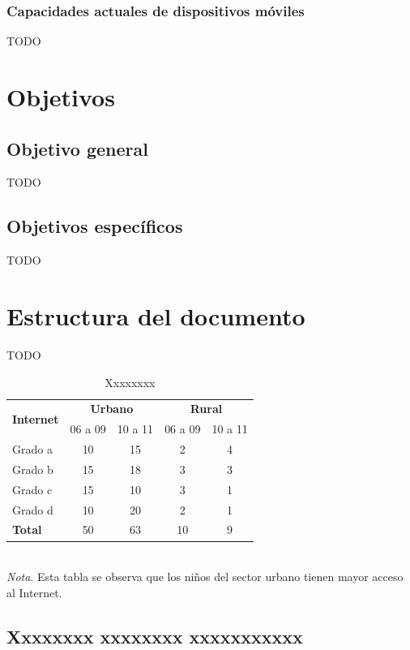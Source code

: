 \subsubsection{Capacidades actuales de dispositivos móviles}
TODO

\section{Objetivos}

\subsection{Objetivo general}
TODO

\subsection{Objetivos específicos}
TODO

\section{Estructura del documento}
TODO

\begin{table}[H]
\centering
\caption{Xxxxxxxx}
\label{tab:tabla1}
\begin{tabular}{@{}lcccc@{}}
\toprule
\multirow{2}{*}{\textbf{Internet}} & \multicolumn{2}{c}{\textbf{Urbano}} & \multicolumn{2}{c}{\textbf{Rural}} \\
\cmidrule(lr){2-3} \cmidrule(lr){4-5}
 & 06 a 09 & 10 a 11 & 06 a 09 & 10 a 11 \\
\midrule
Grado a & 10 & 15 & 2 & 4 \\
Grado b & 15 & 18 & 3 & 3 \\
Grado c & 15 & 10 & 3 & 1 \\
Grado d & 10 & 20 & 2 & 1 \\
\midrule
\textbf{Total} & 50 & 63 & 10 & 9 \\
\bottomrule
\end{tabular}
\vspace{0.5cm}\\
\textit{Nota}. Esta tabla se observa que los niños del sector urbano tienen mayor acceso al Internet.
\end{table}

\subsection{Xxxxxxxx xxxxxxxx xxxxxxxxxxx}

